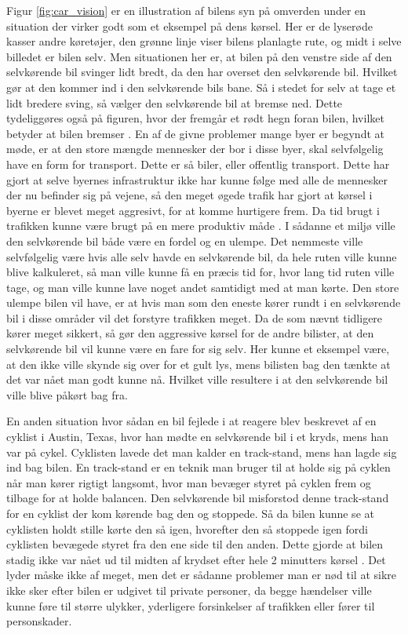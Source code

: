 Figur \ref{fig:car_vision} er en illustration af bilens syn på omverden under en situation der virker godt som et eksempel på dens kørsel. Her er de lyserøde kasser andre køretøjer, den grønne linje viser bilens planlagte rute, og midt i selve billedet er bilen selv. Men situationen her er, at bilen på den venstre side af den selvkørende bil svinger lidt bredt, da den har overset den selvkørende bil. Hvilket gør at den kommer ind i den selvkørende bils bane. Så i stedet for selv at tage et lidt bredere sving, så vælger den selvkørende bil at bremse ned. Dette tydeliggøres også på figuren, hvor der fremgår et rødt hegn foran bilen, hvilket betyder at bilen bremser \cite{Backchannel}. En af de givne problemer mange byer er begyndt at møde, er at den store mængde mennesker der bor i disse byer, skal selvfølgelig have en form for transport. Dette er så biler, eller offentlig transport. Dette har gjort at selve byernes infrastruktur ikke har kunne følge med alle de mennesker der nu befinder sig på vejene, så den meget øgede trafik har gjort at kørsel i byerne er blevet meget aggresivt, for at komme hurtigere frem. Da tid brugt i trafikken kunne være brugt på en mere produktiv måde \cite{Michelin}. I sådanne et miljø ville den selvkørende bil både være en fordel og en ulempe. Det nemmeste ville selvfølgelig være hvis alle selv havde en selvkørende bil, da hele ruten ville kunne blive kalkuleret, så man ville kunne få en præcis tid for, hvor lang tid ruten ville tage, og man ville kunne lave noget andet samtidigt med at man kørte. Den store ulempe bilen vil have, er at hvis man som den eneste kører rundt i en selvkørende bil i disse områder vil det forstyre trafikken meget. Da de som nævnt tidligere kører meget sikkert, så gør den aggressive kørsel for de andre bilister, at den selvkørende bil vil kunne være en fare for sig selv. Her kunne et eksempel være, at den ikke ville skynde sig over for et gult lys, mens bilisten bag den tænkte at det var nået man godt kunne nå. Hvilket ville resultere i at den selvkørende bil ville blive påkørt bag fra.

En anden situation hvor sådan en bil fejlede i at reagere blev beskrevet af en cyklist i Austin, Texas, hvor han mødte en selvkørende bil i et kryds, mens han var på cykel. Cyklisten lavede det man kalder en track-stand, mens han lagde sig ind bag bilen. En track-stand er en teknik man bruger til at holde sig på cyklen når man kører rigtigt langsomt, hvor man bevæger styret på cyklen frem og tilbage for at holde balancen. Den selvkørende bil misforstod denne track-stand for en cyklist der kom kørende bag den og stoppede. Så da bilen kunne se at cyklisten holdt stille kørte den så igen, hvorefter den så stoppede igen fordi cyklisten bevægede styret fra den ene side til den anden. Dette gjorde at bilen stadig ikke var nået ud til midten af krydset efter hele 2 minutters kørsel \cite{VOX}. Det lyder måske ikke af meget, men det er sådanne problemer man er nød til at sikre ikke sker efter bilen er udgivet til private personer, da begge hændelser ville kunne føre til større ulykker, yderligere forsinkelser af trafikken eller fører til personskader. 